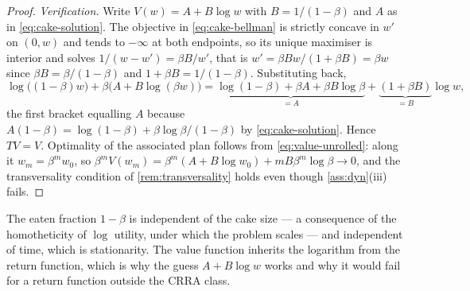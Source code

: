 \begin{proof}
	\emph{Verification.} Write $V(w)=A+B\log w$ with $B=1/(1-\beta)$ and $A$ as in
	\eqref{eq:cake-solution}. The objective in \eqref{eq:cake-bellman} is strictly
	concave in $w'$ on $(0,w)$ and tends to $-\infty$ at both endpoints, so its
	unique maximiser is interior and solves
	$1/(w-w')=\beta B/w'$, that is $w'=\beta Bw/(1+\beta B)=\beta w$ since
	$\beta B=\beta/(1-\beta)$ and $1+\beta B=1/(1-\beta)$. Substituting back,
	\[
		\log\bigl((1-\beta)w\bigr)+\beta\bigl(A+B\log(\beta w)\bigr)
		=\underbrace{\log(1-\beta)+\beta A+\beta B\log\beta}_{=A}
		+\underbrace{(1+\beta B)}_{=B}\log w,
	\]
	the first bracket equalling $A$ because $A(1-\beta)=\log(1-\beta)+\beta\log\beta/(1-\beta)$
	by \eqref{eq:cake-solution}. Hence $TV=V$. Optimality of the associated plan
	follows from \eqref{eq:value-unrolled}: along it $w_m=\beta^{m}w_0$, so
	$\beta^{m}V(w_m)=\beta^{m}(A+B\log w_0)+mB\beta^{m}\log\beta\to0$, and the
	transversality condition of \autoref{rem:transversality} holds even though
	\autoref{ass:dyn}(iii) fails.
\end{proof}

The eaten fraction $1-\beta$ is independent of the cake size --- a consequence of
the homotheticity of $\log$ utility, under which the problem scales --- and
independent of time, which is stationarity. The value function inherits the
logarithm from the return function, which is why the guess $A+B\log w$ works and
why it would fail for a return function outside the CRRA class.


